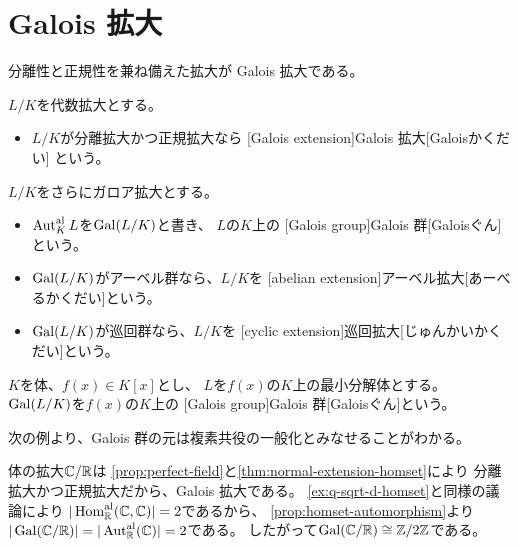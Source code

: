 \documentclass[report]{jlreq}
\begin{document}
%
\section{Galois 拡大}


分離性と正規性を兼ね備えた拡大が Galois 拡大である。

\begin{definition}[Galois 拡大]
    $L/K$を代数拡大とする。
    \begin{itemize}
        \item $L/K$が分離拡大かつ正規拡大なら
        [Galois extension]{Galois 拡大}[Galoisかくだい]
        という。
    \end{itemize}
    $L/K$をさらにガロア拡大とする。
    \begin{itemize}
        \item $\operatorname{Aut}_K^{\mathrm{al}} L$を$\operatorname{Gal}(L/K)$と書き、
            $L$の$K$上の
            [Galois group]{Galois 群}[Galoisぐん]という。
        \item $\operatorname{Gal}(L/K)$がアーベル群なら、$L/K$を
            [abelian extension]{アーベル拡大}[あーべるかくだい]という。
        \item $\operatorname{Gal}(L/K)$が巡回群なら、$L/K$を
            [cyclic extension]{巡回拡大}[じゅんかいかくだい]という。
    \end{itemize}
\end{definition}

\begin{definition}
    $K$を体、$f(x) \in K[x]$とし、
    $L$を$f(x)$の$K$上の最小分解体とする。
    $\operatorname{Gal}(L/K)$を$f(x)$の$K$上の
    [Galois group]{Galois 群}[Galoisぐん]という。
\end{definition}

次の例より、Galois 群の元は複素共役の一般化とみなせることがわかる。

\begin{example}
    体の拡大$\mathbb{C}/\mathbb{R}$は
    \cref{prop:perfect-field}と\cref{thm:normal-extension-homset}により
    分離拡大かつ正規拡大だから、Galois 拡大である。
    \cref{ex:q-sqrt-d-homset}と同様の議論により
    $|\operatorname{Hom}_{\mathbb{R}}^{\mathrm{al}}(\mathbb{C}, \mathbb{C})| = 2$であるから、
    \cref{prop:homset-automorphism}より
    $|\operatorname{Gal}(\mathbb{C}/\mathbb{R})| = |\operatorname{Aut}_{\mathbb{R}}^{\mathrm{al}}(\mathbb{C})| = 2$である。
    したがって$\operatorname{Gal}(\mathbb{C}/\mathbb{R}) \cong \mathbb{Z}/2\mathbb{Z}$である。
\end{example}
\end{document}
